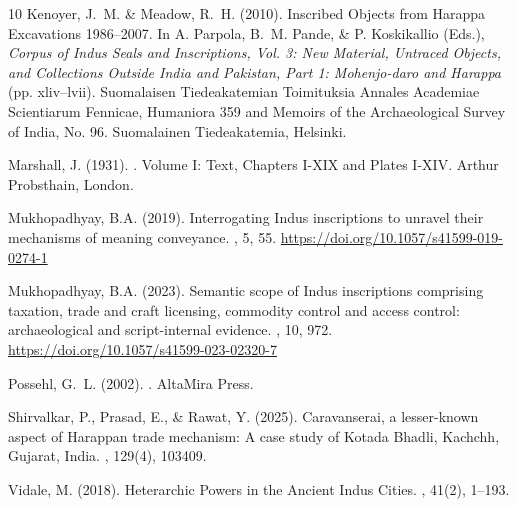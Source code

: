 \documentclass[12pt]{article}
\begin{document}
\begin{thebibliography}{10}
Kenoyer, J.~M. \& Meadow, R.~H. (2010).
\newblock Inscribed Objects from {H}arappa {E}xcavations 1986--2007.
\newblock In A. Parpola, B.~M. Pande, \& P. Koskikallio (Eds.), {\em Corpus of Indus Seals and Inscriptions, Vol. 3: New Material, Untraced Objects, and Collections Outside India and Pakistan, Part 1: Mohenjo-daro and Harappa} (pp. xliv--lvii).
\newblock Suomalaisen Tiedeakatemian Toimituksia Annales Academiae Scientiarum Fennicae, Humaniora 359 and Memoirs of the Archaeological Survey of India, No. 96. Suomalainen Tiedeakatemia, Helsinki.

Marshall, J. (1931).
.
\newblock Volume I: Text, Chapters I-XIX and Plates I-XIV.
\newblock Arthur Probsthain, London.

Mukhopadhyay, B.A. (2019).
\newblock Interrogating {I}ndus inscriptions to unravel their mechanisms of meaning
conveyance.
, 5, 55.
\newblock \url{https://doi.org/10.1057/s41599-019-0274-1}

Mukhopadhyay, B.A. (2023).
\newblock Semantic scope of {I}ndus inscriptions comprising taxation, trade and craft
licensing, commodity control and access control: archaeological and script-internal evidence.
, 10, 972.
\newblock \url{https://doi.org/10.1057/s41599-023-02320-7}

Possehl, G.~L. (2002).
.
\newblock AltaMira Press.

Shirvalkar, P., Prasad, E., \& Rawat, Y. (2025).
\newblock Caravanserai, a lesser-known aspect of {H}arappan trade mechanism: {A} case study of {K}otada {B}hadli, {K}achchh, {G}ujarat, {I}ndia.
, 129(4), 103409.

Vidale, M. (2018).
\newblock Heterarchic {P}owers in the {A}ncient {I}ndus {C}ities.
, 41(2), 1--193.

\end{thebibliography}
\end{document}
